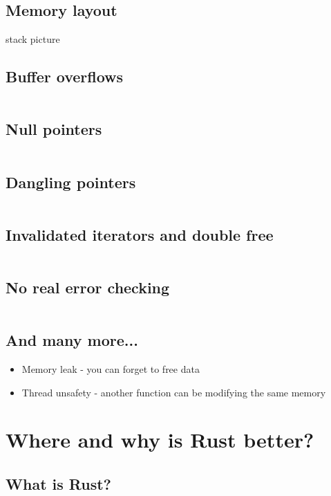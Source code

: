 \documentclass[usenames,twocolumn,dvipsnames,10pt,a4wide]{article}
\begin{document}
\subsection{Memory layout} 
stack picture
	

\subsection{Buffer overflows} 
	\inputminted[fontsize=\normalsize]{c}{code/overflow.c}


\subsection{Null pointers}
	\inputminted[fontsize=\normalsize]{c}{code/nullp.c}


\subsection{Dangling pointers} 
	\inputminted[fontsize=\normalsize]{c}{code/danp.c}


\subsection{Invalidated iterators and double free} 
	\inputminted[fontsize=\normalsize]{c}{code/iter.c}


\subsection{No real error checking} 
	\inputminted[fontsize=\normalsize]{c}{code/errorcheck.c}


\subsection{And many more...}
	\begin{itemize}[label=$\bullet$]
		\item Memory leak - you can forget to free data
		\item Thread unsafety - another function can be 
			modifying the same memory
	\end{itemize}




\section{Where and why is Rust better?}

\subsection{What is Rust?}
\end{document}
